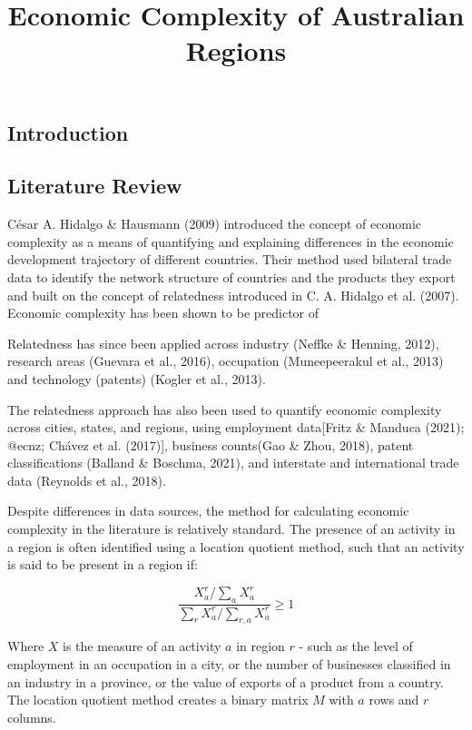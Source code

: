 \documentclass[
]{agujournal2019}
\begin{document}
\title{Economic Complexity of Australian Regions}








\subsection{Introduction}\label{introduction}

\subsection{Literature Review}\label{literature-review}

César A. Hidalgo \& Hausmann (2009) introduced the concept of economic
complexity as a means of quantifying and explaining differences in the
economic development trajectory of different countries. Their method
used bilateral trade data to identify the network structure of countries
and the products they export and built on the concept of relatedness
introduced in C. A. Hidalgo et al. (2007). Economic complexity has been
shown to be predictor of

Relatedness has since been applied across industry (Neffke \& Henning,
2012), research areas (Guevara et al., 2016), occupation (Muneepeerakul
et al., 2013) and technology (patents) (Kogler et al., 2013).

The relatedness approach has also been used to quantify economic
complexity across cities, states, and regions, using employment
data{[}Fritz \& Manduca (2021); @ecnz; Chávez et al. (2017){]}, business
counts(Gao \& Zhou, 2018), patent classifications (Balland \& Boschma,
2021), and interstate and international trade data (Reynolds et al.,
2018).

Despite differences in data sources, the method for calculating economic
complexity in the literature is relatively standard. The presence of an
activity in a region is often identified using a location quotient
method, such that an activity is said to be present in a region if:

\[\frac{X_a^r/\sum_{a}X_a^r}{\sum_{r}X_a^r/\sum_{r,a}X_a^r} \geq 1\]

Where \(X\) is the measure of an activity \(a\) in region \(r\) - such
as the level of employment in an occupation in a city, or the number of
businesses classified in an industry in a province, or the value of
exports of a product from a country. The location quotient method
creates a binary matrix \(M\) with \(a\) rows and \(r\) columns.
\end{document}
